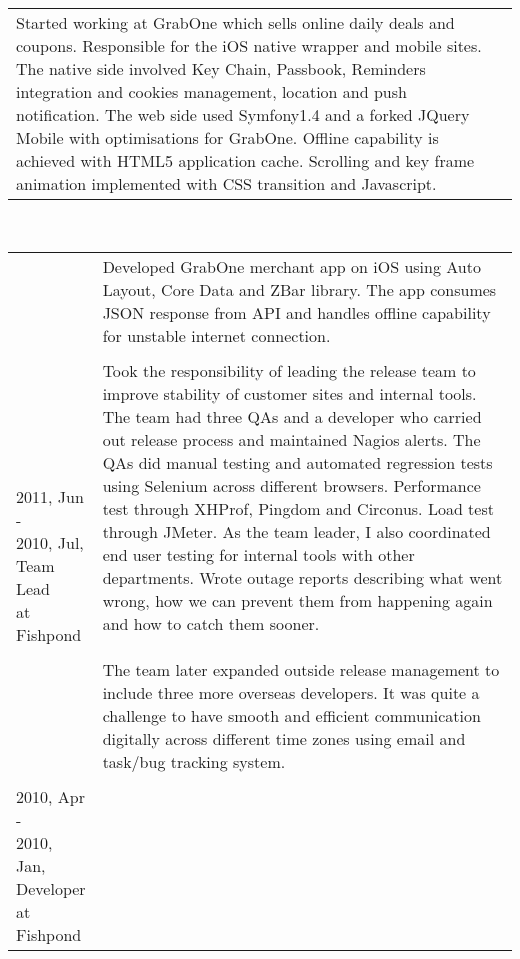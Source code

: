 \begin{resume}
\begin{tabular}{ll}
{Started working at GrabOne which sells online daily deals and coupons. Responsible for the iOS native wrapper and mobile sites. The native side involved Key Chain, Passbook, Reminders integration and cookies management, location and push notification. The web side used Symfony1.4 and a forked JQuery Mobile with optimisations for GrabOne. Offline capability is achieved with HTML5 application cache. Scrolling and key frame animation implemented with CSS transition and Javascript. 

}\end{tabular}\\
\begin{tabular}{ll}
\parbox[t]{30mm}{} & \parbox[t]{116mm}{

Developed GrabOne merchant app on iOS using Auto Layout, Core Data and ZBar library. The app consumes JSON response from API and handles offline capability for unstable internet connection.

}\\\\
\parbox[t]{30mm}{2011, Jun - \\ 2010, Jul,\\Team Lead\\at Fishpond} & \parbox[t]{116mm}{

Took the responsibility of leading the release team to improve stability of customer sites and internal tools. The team had three QAs and a developer who carried out release process and maintained Nagios alerts. The QAs did manual testing and automated regression tests using Selenium across different browsers. Performance test through XHProf, Pingdom and Circonus. Load test through JMeter. As the team leader, I also coordinated end user testing for internal tools with other departments. Wrote outage reports describing what went wrong, how we can prevent them from happening again and how to catch them sooner.
\\\\
The team later expanded outside release management to include three more overseas developers. It was quite a challenge to have smooth and efficient communication digitally across different time zones using email and task/bug tracking system.

}\\\\
\parbox[t]{30mm}{2010, Apr - \\ 2010, Jan,\\Developer\\at Fishpond} & \parbox[t]{116mm}{

}
\end{tabular}
\end{resume}

